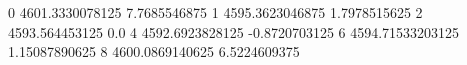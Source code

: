 0 4601.3330078125 7.7685546875
1 4595.3623046875 1.7978515625
2 4593.564453125 0.0
4 4592.6923828125 -0.8720703125
6 4594.71533203125 1.15087890625
8 4600.0869140625 6.5224609375
